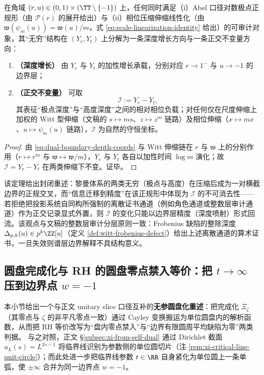 \begin{theorem}[双边界正规形与正交不变量]\label{thm:dual-boundary-normal-form}
在角域 \((r,u)\in(0,1)\times(\TT\setminus\{-1\})\) 上，任何同时满足（i）Abel 口径对数极点正规形（由 \(\mathcal{P}(r)\) 的展开给出）与（ii）相位压缩伸缩线性化（由 \(\mathfrak{w}(\psi_m(u))=\mathfrak{w}(u)/m\)，式 \eqref{eq:scale-linearization-identity} 给出）的可审计对象，其“无穷”结构在 \((Y_r,Y_t)\) 上分解为一条深度增长方向与一条正交不变量方向：
\begin{enumerate}
  \item \textbf{（深度增长）} 由 \(Y_r\) 与 \(Y_t\) 的加性增长承载，分别对应 \(r\to 1^{-}\) 与 \(u\to -1\) 的边界层；
  \item \textbf{（正交不变量）} 可取
  \[
  \mathcal{I}:=Y_r-Y_t,
  \]
  其表征“极点深度”与“高度深度”之间的相对相位负载；对任何仅在尺度伸缩上加权的 Witt 型伸缩（文稿的 \(s\mapsto ms\)、\(z\mapsto z^{m}\) 链路）及相位伸缩（\(x\mapsto mx\)、\(u\mapsto\psi_m(u)\) 链路），\(\mathcal{I}\) 为自然的守恒坐标。
\end{enumerate}
\end{theorem}
\begin{proof}
由 \eqref{eq:dual-boundary-depth-coords} 与 Witt 伸缩链在 \(r\) 与 \(\mathfrak{w}\) 上的分别作用（\(r\mapsto r^{m}\) 与 \(\mathfrak{w}\mapsto \mathfrak{w}/m\)），\(Y_r\) 与 \(Y_t\) 各自以加性时间 \(\log m\) 演化；故 \(\mathcal{I}=Y_r-Y_t\) 在两类伸缩下不变。证毕。
\end{proof}
该定理给出封闭重述：黎曼体系的两类无穷（极点与高度）在压缩后成为一对横截边界的正规交叉，而“信息迁移到精度”在该正规形中体现为 \(\mathcal{I}\) 的不可消去性——若拒绝把投影系统自同构所强制的离散证书通道（例如角色通道或整数层审计通道）作为正交记录显式外置，则 \(\mathcal{I}\) 的变化只能以边界层精度（深度喷射）形式回流。该观点与文稿的整数层审计分层原则一致：Frobenius 缺陷的整除深度 \(\Delta_{p,k}(u)\in p^k\ZZ[u]\)（定义 \ref{def:witt-frobenius-defect}）给出上述离散通道的算术证书，一旦失效则谱层边界解释不具结构意义。

\subsection{圆盘完成化与 RH 的圆盘零点禁入等价：把 \texorpdfstring{$t\to\infty$}{t->infty} 压到边界点 \texorpdfstring{$w=-1$}{w=-1}}\label{subsec:unit-disk-rh-equivalence}
本小节给出一个与正文 unitary slice 口径互补的\textbf{无参圆盘化重述}：把完成化 \(\Xi_{\zeta}\)（其零点与 \(\zeta\) 的非平凡零点一致）通过 Cayley 变换搬运为单位圆盘内的解析函数，从而把 RH 等价改写为“盘内零点禁入”与“边界有限圆周平均缺陷为零”两类判据。
与之对照，正文 \S\ref{subsec:xi-from-self-dual} 通过 Dirichlet 截面 \(u_L(s)=L^{2s-1}\) 将临界线识别为参数侧的单位圆切片（注 \ref{rem:xi-critical-line-unit-circle}）；而此处进一步把临界线参数 \(t\in\RR\) 自身紧化为单位圆上一条单弧，使 \(\pm\infty\) 合并为同一边界点 \(w=-1\)。

